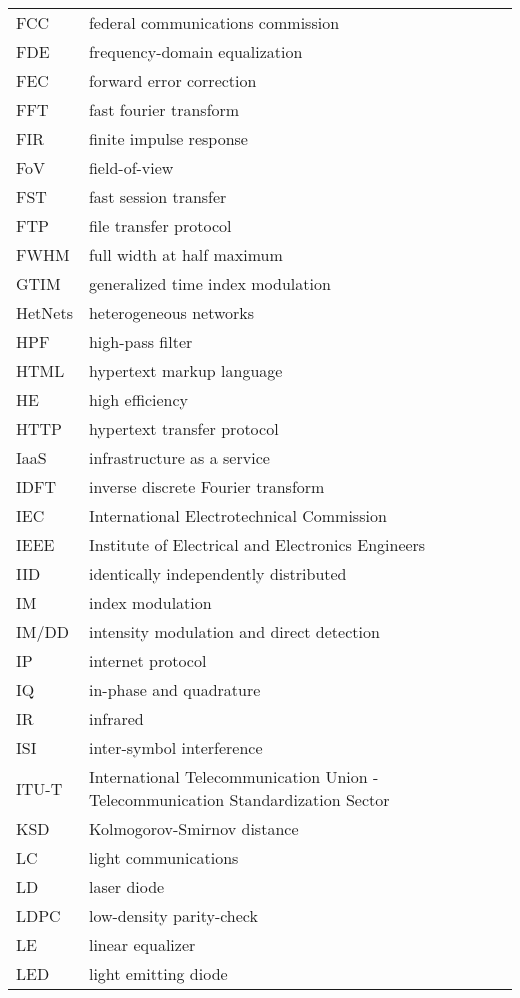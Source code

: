 \begin{longtable}{ll}
 FCC&federal communications  commission\\
 FDE&frequency-domain equalization\\
 FEC&forward error correction\\
 FFT&fast fourier transform\\
 FIR&finite impulse response\\
 FoV&field-of-view\\
 FST&fast session transfer\\
 FTP&file transfer protocol\\
 FWHM&full width at half maximum\\
 GTIM&generalized time index modulation\\
 HetNets&heterogeneous networks\\
 HPF&high-pass filter\\
 HTML&hypertext markup language\\
 HE&high efficiency\\
 HTTP&hypertext transfer protocol\\
 IaaS&infrastructure as a service\\
 IDFT&inverse discrete Fourier transform\\
 IEC&International Electrotechnical Commission\\
 IEEE&Institute of Electrical and Electronics Engineers\\
 IID&identically independently distributed\\
 IM&index modulation\\
 IM/DD&intensity modulation and direct detection\\
 IP&internet protocol\\
 IQ&in-phase and quadrature\\
 IR&infrared\\
 ISI&inter-symbol interference\\
 ITU-T&International Telecommunication Union - Telecommunication Standardization Sector\\
 KSD&Kolmogorov-Smirnov distance\\
 LC&light communications\\
 LD&laser diode\\
 LDPC&low-density parity-check\\
 LE&linear equalizer\\
 LED&light emitting diode\\
\end{longtable}


